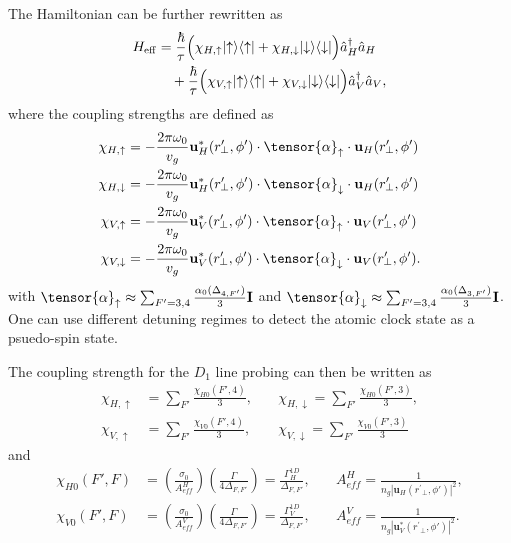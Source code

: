 \documentclass[preprint,aps,pra,onecolumn]{revtex4-1} %
\begin{document}
The Hamiltonian can be further rewritten as
\begin{align}
H_{\rm eff} & = \frac{ \hbar }{ \tau}\Big( \chi_{H,\uparrow}\lvert{\uparrow}\rangle\langle{\uparrow}\rvert +  \chi_{H,\downarrow} \lvert{\downarrow}\rangle\langle{\downarrow}\rvert \Big) \hat{a}_H^\dagger \hat{a}_H \nonumber\\
&\quad +  \frac{ \hbar }{ \tau} \Big( \chi_{V,\uparrow}\lvert{\uparrow}\rangle\langle{\uparrow}\rvert +  \chi_{V,\downarrow} \lvert{\downarrow}\rangle\langle{\downarrow}\rvert \Big) \hat{a}_V^\dagger \hat{a}_V  ,
\end{align}
where the coupling strengths are defined as
\begin{align}
\chi_{H,\uparrow} &=  -\frac{2\pi\omega_0}{v_g} \mathbf{u}^*_{H}(r^\prime\!\!_\perp,\phi') \cdot\tensor{\alpha}_{\uparrow}\cdot \mathbf{u}_{H}(r^\prime\!\!_\perp,\phi') \\
\chi_{H,\downarrow} &=  -\frac{2\pi\omega_0}{v_g} \mathbf{u}^*_{H}(r^\prime\!\!_\perp,\phi') \cdot\tensor{\alpha}_{\downarrow}\cdot \mathbf{u}_{H}(r^\prime\!\!_\perp,\phi') \\
\chi_{V,\uparrow} &=  -\frac{2\pi\omega_0}{v_g}  \mathbf{u}^*_{V}(r^\prime\!\!_\perp,\phi') \cdot\tensor{\alpha}_{\uparrow}\cdot \mathbf{u}_{V}(r^\prime\!\!_\perp,\phi')  \\
\chi_{V,\downarrow} &=  -\frac{2\pi\omega_0}{v_g}  \mathbf{u}^*_{V}(r^\prime\!\!_\perp,\phi') \cdot\tensor{\alpha}_{\downarrow}\cdot \mathbf{u}_{V}(r^\prime\!\!_\perp,\phi'). 
\end{align}
with $\tensor{\alpha}_{\uparrow} \approx\sum_{F'=3,4}\frac{\alpha_0(\Delta_{4,F'})}{3}\mathbf{I}$
and $\tensor{\alpha}_{\downarrow} \approx\sum_{F'=3,4}\frac{\alpha_0(\Delta_{3,F'})}{3}\mathbf{I}$.
One can use different detuning regimes to detect the atomic clock state as a psuedo-spin state.

The coupling strength for the $ D_1 $ line probing can then be written as
\begin{align}
\chi_{H,\uparrow} &=  \sum_{F'} \frac{\chi_{H0}(F',4)}{3}, \quad
&\chi_{H,\downarrow} = \sum_{F'} \frac{\chi_{H0}(F',3) }{3}, \\
\chi_{V,\uparrow} &=  \sum_{F'} \frac{\chi_{V0}(F',4)}{3}, \quad
&\chi_{V,\downarrow} = \sum_{F'} \frac{\chi_{V0}(F',3) }{3} 
\end{align}
and 
\begin{align}
\chi_{H0}(F',F) &= \left( \frac{ \sigma_0}{A_{ef\!f}^H} \right) \left( \frac{\Gamma}{4 \Delta_{F,F'}} \right)=\frac{\Gamma_H^{1D}}{\Delta_{F,F'}},\quad
& A_{ef\!f}^H = \frac{1}{n_g|\mathbf{u}_{H}(r^\prime\!\!_\perp,\phi')|^2 },\\
\chi_{V0}(F',F) &= \left( \frac{ \sigma_0}{A_{ef\!f}^V} \right) \left( \frac{\Gamma}{4 \Delta_{F,F'}} \right)=\frac{\Gamma_V^{1D}}{\Delta_{F,F'}},\quad
& A_{ef\!f}^V = \frac{1}{n_g|\mathbf{u}^*_{V}(r^\prime\!\!_\perp,\phi')|^2 }.
\end{align}
\end{document}
